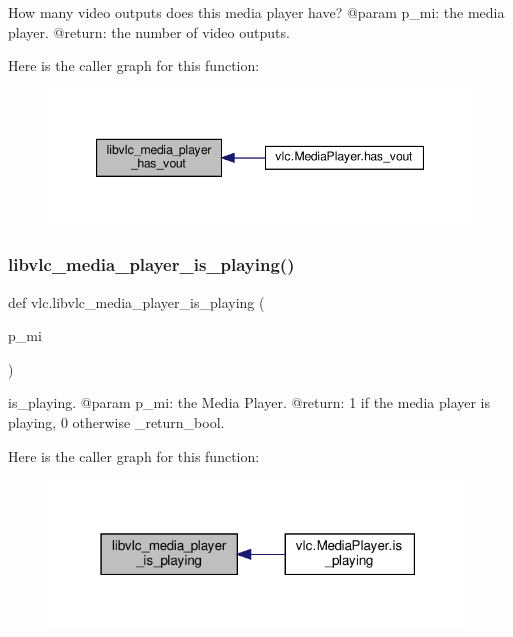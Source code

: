 \begin{DoxyVerb}How many video outputs does this media player have?
@param p_mi: the media player.
@return: the number of video outputs.
\end{DoxyVerb}
 Here is the caller graph for this function\+:
\nopagebreak
\begin{figure}[H]
\begin{center}
\leavevmode
\includegraphics[width=347pt]{namespacevlc_aa73c70b2cb89d51766a528e4ba329f06_icgraph}
\end{center}
\end{figure}
\mbox{\label{namespacevlc_ab4fefef2802730d42090b8fdcaf8dc8a}} 
\subsubsection{\texorpdfstring{libvlc\+\_\+media\+\_\+player\+\_\+is\+\_\+playing()}{libvlc\_media\_player\_is\_playing()}}
{\footnotesize\ttfamily def vlc.\+libvlc\+\_\+media\+\_\+player\+\_\+is\+\_\+playing (\begin{DoxyParamCaption}\item[{}]{p\+\_\+mi }\end{DoxyParamCaption})}

\begin{DoxyVerb}is_playing.
@param p_mi: the Media Player.
@return: 1 if the media player is playing, 0 otherwise \libvlc_return_bool.
\end{DoxyVerb}
 Here is the caller graph for this function\+:
\nopagebreak
\begin{figure}[H]
\begin{center}
\leavevmode
\includegraphics[width=315pt]{namespacevlc_ab4fefef2802730d42090b8fdcaf8dc8a_icgraph}
\end{center}
\end{figure}
\mbox{\label{namespacevlc_a0dfac2d253dd73294fbc61a21a0dab61}} 
